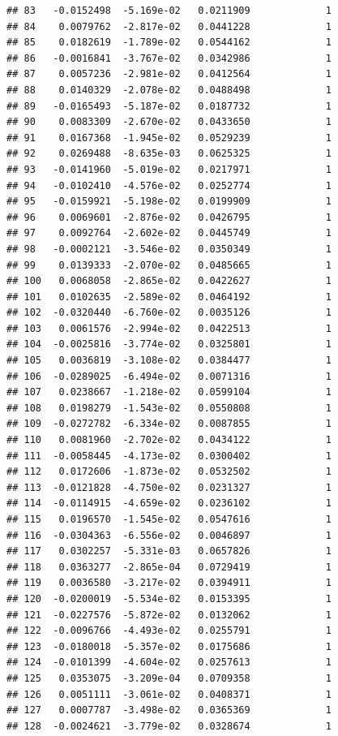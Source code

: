 \documentclass[12pt]{article}\usepackage[]{graphicx}\usepackage[]{xcolor}
\makeatletter
\newenvironment{kframe}{%
 \def\at@end@of@kframe{}%
 \ifinner\ifhmode%
  \def\at@end@of@kframe{\end{minipage}}%
  \begin{minipage}{\columnwidth}%
 \fi\fi%
 \def\FrameCommand##1{\hskip\@totalleftmargin \hskip-\fboxsep
 \colorbox{shadecolor}{##1}\hskip-\fboxsep
     \hskip-\linewidth \hskip-\@totalleftmargin \hskip\columnwidth}%
 \MakeFramed {\advance\hsize-\width
   \@totalleftmargin\z@ \linewidth\hsize
   \@setminipage}}%
 {\par\unskip\endMakeFramed%
 \at@end@of@kframe}
\newenvironment{knitrout}{}{} %
\makeatother
\begin{document}
\begin{knitrout}
\begin{kframe}
\begin{verbatim}
## 83   -0.0152498  -5.169e-02   0.0211909             1
## 84    0.0079762  -2.817e-02   0.0441228             1
## 85    0.0182619  -1.789e-02   0.0544162             1
## 86   -0.0016841  -3.767e-02   0.0342986             1
## 87    0.0057236  -2.981e-02   0.0412564             1
## 88    0.0140329  -2.078e-02   0.0488498             1
## 89   -0.0165493  -5.187e-02   0.0187732             1
## 90    0.0083309  -2.670e-02   0.0433650             1
## 91    0.0167368  -1.945e-02   0.0529239             1
## 92    0.0269488  -8.635e-03   0.0625325             1
## 93   -0.0141960  -5.019e-02   0.0217971             1
## 94   -0.0102410  -4.576e-02   0.0252774             1
## 95   -0.0159921  -5.198e-02   0.0199909             1
## 96    0.0069601  -2.876e-02   0.0426795             1
## 97    0.0092764  -2.602e-02   0.0445749             1
## 98   -0.0002121  -3.546e-02   0.0350349             1
## 99    0.0139333  -2.070e-02   0.0485665             1
## 100   0.0068058  -2.865e-02   0.0422627             1
## 101   0.0102635  -2.589e-02   0.0464192             1
## 102  -0.0320440  -6.760e-02   0.0035126             1
## 103   0.0061576  -2.994e-02   0.0422513             1
## 104  -0.0025816  -3.774e-02   0.0325801             1
## 105   0.0036819  -3.108e-02   0.0384477             1
## 106  -0.0289025  -6.494e-02   0.0071316             1
## 107   0.0238667  -1.218e-02   0.0599104             1
## 108   0.0198279  -1.543e-02   0.0550808             1
## 109  -0.0272782  -6.334e-02   0.0087855             1
## 110   0.0081960  -2.702e-02   0.0434122             1
## 111  -0.0058445  -4.173e-02   0.0300402             1
## 112   0.0172606  -1.873e-02   0.0532502             1
## 113  -0.0121828  -4.750e-02   0.0231327             1
## 114  -0.0114915  -4.659e-02   0.0236102             1
## 115   0.0196570  -1.545e-02   0.0547616             1
## 116  -0.0304363  -6.556e-02   0.0046897             1
## 117   0.0302257  -5.331e-03   0.0657826             1
## 118   0.0363277  -2.865e-04   0.0729419             1
## 119   0.0036580  -3.217e-02   0.0394911             1
## 120  -0.0200019  -5.534e-02   0.0153395             1
## 121  -0.0227576  -5.872e-02   0.0132062             1
## 122  -0.0096766  -4.493e-02   0.0255791             1
## 123  -0.0180018  -5.357e-02   0.0175686             1
## 124  -0.0101399  -4.604e-02   0.0257613             1
## 125   0.0353075  -3.209e-04   0.0709358             1
## 126   0.0051111  -3.061e-02   0.0408371             1
## 127   0.0007787  -3.498e-02   0.0365369             1
## 128  -0.0024621  -3.779e-02   0.0328674             1

\end{verbatim}
\end{kframe}
\end{knitrout}
\end{document}
